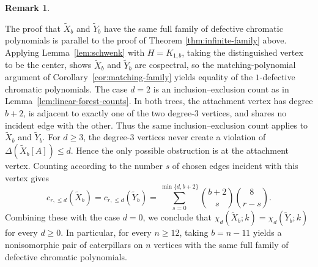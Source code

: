 \documentclass[12pt,reqno]{amsart}
\theoremstyle{definition}
\newtheorem{rmk}[thm]{Remark}
\begin{document}
\begin{rmk}
\begin{center}
\end{center}

The proof that $\widetilde{X}_b$ and $\widetilde{Y}_b$ have the same full family of defective chromatic polynomials is parallel to the proof of Theorem \ref{thm:infinite-family} above. Applying Lemma~\ref{lem:schwenk} with $H=K_{1,b}$, taking the distinguished vertex to be the center, shows $\widetilde{X}_b$ and $\widetilde{Y}_b$ are cospectral, so the matching-polynomial argument of Corollary~\ref{cor:matching-family} yields equality of the $1$-defective chromatic polynomials. The case $d=2$ is an inclusion--exclusion count as in
Lemma~\ref{lem:linear-forest-counts}. In both trees, the attachment vertex has degree $b+2$, is adjacent to exactly one of the two degree-$3$ vertices, and shares no incident edge with the other. Thus the same inclusion--exclusion count applies to $\widetilde{X}_b$ and $\widetilde{Y}_b$. For $d\geq 3$, the degree-$3$ vertices never create a violation of $\Delta(\widetilde{X}_b[A])\leq d$. Hence the only possible obstruction is at the attachment vertex. Counting according to the number $s$ of chosen edges incident with this
vertex gives
\[
c_{r,\leq d}(\widetilde{X}_b)
=
c_{r,\leq d}(\widetilde{Y}_b)
=
\sum_{s=0}^{\min\{d,b+2\}}
\binom{b+2}{s}\binom{8}{r-s}.
\]
Combining these with the case $d=0$, we conclude that $\chi_d(\widetilde{X}_b;k)=\chi_d(\widetilde{Y}_b;k)$ for every $d\geq 0$. In particular, for every $n\geq 12$, taking $b=n-11$ yields a nonisomorphic pair of caterpillars on $n$ vertices with the same full family of defective chromatic polynomials.
\end{rmk}
\end{document}
